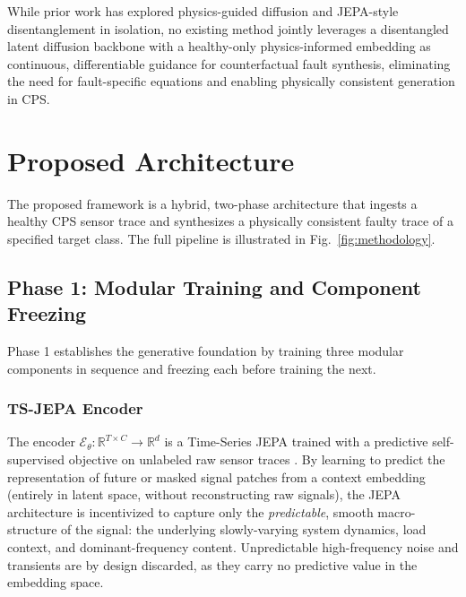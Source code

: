 \documentclass[conference]{IEEEtran}
\newcommand{\Enc}{\mathcal{E}}
\begin{document}
While prior work has explored physics-guided diffusion and JEPA-style disentanglement in isolation, no existing method jointly leverages a disentangled latent diffusion backbone with a healthy-only physics-informed embedding as continuous, differentiable guidance for counterfactual fault synthesis, eliminating the need for fault-specific equations and enabling physically consistent generation in CPS.

\section{Proposed Architecture}
\label{sec:architecture}

The proposed framework is a hybrid, two-phase architecture that ingests a healthy CPS sensor trace and synthesizes a physically consistent faulty trace of a specified target class. The full pipeline is illustrated in Fig.~\ref{fig:methodology}.

\subsection{Phase 1: Modular Training and Component Freezing}

Phase 1 establishes the generative foundation by training three modular components in sequence and freezing each before training the next.

\subsubsection{TS-JEPA Encoder}

The encoder $\Enc_\theta:\mathbb{R}^{T\times C}\to\mathbb{R}^{d}$ is a Time-Series JEPA trained with a predictive self-supervised objective on unlabeled raw sensor traces \cite{jepa2024}. By learning to predict the representation of future or masked signal patches from a context embedding (entirely in latent space, without reconstructing raw signals), the JEPA architecture is incentivized to capture only the \emph{predictable}, smooth macro-structure of the signal: the underlying slowly-varying system dynamics, load context, and dominant-frequency content. Unpredictable high-frequency noise and transients are by design discarded, as they carry no predictive value in the embedding space.
\end{document}
